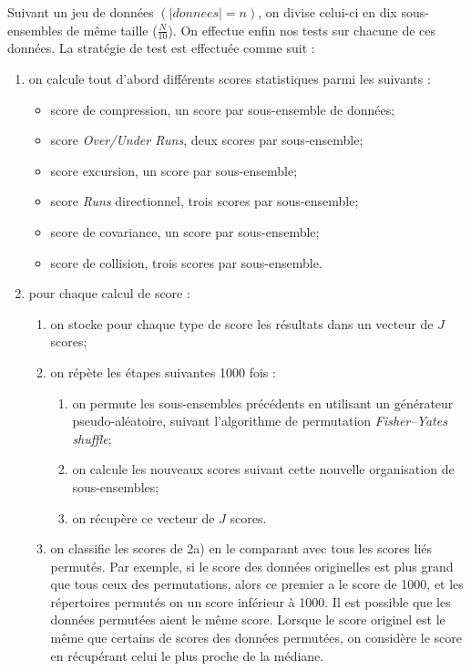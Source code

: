 Suivant un jeu de données $(|donnees|=n)$, on divise celui-ci en dix sous-ensembles de même taille ($\frac{N}{10}$). On effectue enfin nos tests sur chacune de ces données. La stratégie de test est effectuée comme suit : 
\begin{enumerate}
\item on calcule tout d'abord différents scores statistiques parmi les suivants :
	\begin{itemize}
	\item score de compression, un score par sous-ensemble de données;
	\item score \textit{Over/Under Runs}, deux scores par sous-ensemble;
	\item score excursion, un score par sous-ensemble;
	\item score \textit{Runs} directionnel, trois scores par sous-ensemble;
	\item score de covariance, un score par sous-ensemble;
	\item score de collision, trois scores par sous-ensemble.\\
	\end{itemize}
	
\item pour chaque calcul de score : 
	\begin{enumerate}
	\item on stocke pour chaque type de score les résultats dans un vecteur de $J$ scores;
	\item on répète les étapes suivantes 1000 fois :
		\begin{enumerate}
		\item on permute les sous-ensembles précédents en utilisant un générateur pseudo-aléatoire, suivant l'algorithme de permutation \textit{Fisher–Yates shuffle};
		\item on calcule les nouveaux scores suivant cette nouvelle organisation de sous-ensembles;
		\item on récupère ce vecteur de $J$ scores.\\
		\end{enumerate}
	\item on classifie les scores de 2a) en le comparant avec tous les scores liés permutés. Par exemple, si le score des données originelles est plus grand que tous ceux des permutations, alors ce premier a le score de 1000, et les répertoires permutés on un score inférieur à 1000. Il est possible que les données permutées aient le même score. Lorsque le score originel est le même que certains de scores des données permutées, on considère le score en récupérant celui le plus proche de la médiane. \\
	

\end{enumerate}
\end{enumerate}
